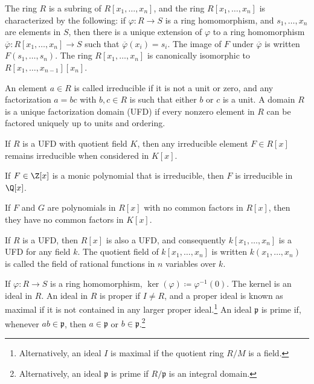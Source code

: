 \documentclass[10pt]{mypackage}
\begin{document}
The ring $R$ is a subring of $R\left[x_1,\dots,x_n\right]$, and the ring $R\left[x_1,\dots,x_n\right]$ is characterized by the following: if $\varphi\colon R\rightarrow S$ is a ring homomorphism, and $s_1,\dots,x_n$ are elements in $S$, then there is a unique extension of $\varphi$ to a ring homomorphism $\overline{\varphi}\colon R\left[x_1,\dots,x_n\right]\rightarrow S$ such that $\overline{\varphi}\left(x_i\right) = s_i$. The image of $F$ under $\overline{\varphi}$ is written $F\left(s_1,\dots,s_n\right)$. The ring $R\left[x_1,\dots,x_n\right]$ is canonically isomorphic to $R\left[x_1,\dots,x_{n-1}\right]\left[x_n\right]$.\newline

An element $a\in R$ is called irreducible if it is not a unit or zero, and any factorization $a=bc$ with $b,c\in R$ is such that either $b $ or $c$ is a unit. A domain $R$ is a unique factorization domain (UFD) if every nonzero element in $R$ can be factored uniquely up to units and ordering.\newline

If $R$ is a UFD with quotient field $K$, then any irreducible element $F\in R[x]$ remains irreducible when considered in $K[x]$.
\begin{theorem}
  If $F\in \Z[x]$ is a monic polynomial that is irreducible, then $F$ is irreducible in $\Q[x]$.
\end{theorem}
If $F$ and $G$ are polynomials in $R[x]$ with no common factors in $R[x]$, then they have no common factors in $K[x]$.\newline

If $R$ is a UFD, then $R[x]$ is also a UFD, and consequently $k\left[x_1,\dots,x_n\right]$ is a UFD for any field $k$. The quotient field of $k\left[x_1,\dots,x_n\right]$ is written $k\left(x_1,\dots,x_n\right)$ is called the field of rational functions in $n$ variables over $k$.\newline

If $\varphi\colon R\rightarrow S$ is a ring homomorphism, $\ker\left(\varphi\right)\coloneq \varphi^{-1}(0)$. The kernel is an ideal in $R$. An ideal in $R$ is proper if $I\neq R$, and a proper ideal is known as maximal if it is not contained in any larger proper ideal.\footnote{Alternatively, an ideal $I$ is maximal if the quotient ring $R/M$ is a field.} An ideal $\mathfrak{p}$ is prime if, whenever $ab\in \mathfrak{p}$, then $a\in \mathfrak{p}$ or $b\in \mathfrak{p}$.\footnote{Alternatively, an ideal $\mathfrak{p}$ is prime if $R/\mathfrak{p}$ is an integral domain.}\newline
\end{document}

